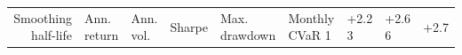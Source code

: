 \begin{tabular}{rlllllll}
\toprule
Smoothing half-life & Ann. return & Ann. vol. & Sharpe & Max. drawdown & Monthly CVaR 1%
 & +2.2%
3 & +2.6%
6 & +2.7%
\bottomrule
\end{tabular}
